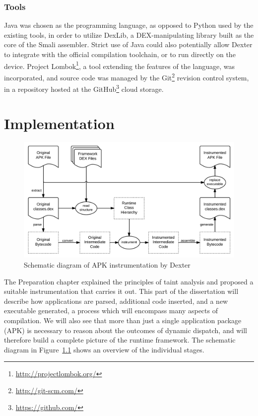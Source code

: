 \documentclass[12pt,twoside,notitlepage]{report}
\newcommand{\weblink}[1] {\footnote{\scriptsize\url{#1}}}
\begin{document}
\subsection{Tools}

Java was chosen as the programming language, as opposed to Python used by the existing tools, in order to utilize DexLib, a DEX-manipulating library built as the core of the Smali assembler. Strict use of Java could also potentially allow Dexter to integrate with the official compilation toolchain, or to run directly on the device. Project Lombok\weblink{http://projectlombok.org/}, a tool extending the features of the language, was incorporated, and source code was managed by the Git\weblink{http://git-scm.com/} revision control system, in a repository hosted at the GitHub\weblink{https://github.com/} cloud storage.

\cleardoublepage
\chapter{Implementation}

\begin{figure}
	\centerline{	
		\includegraphics[width=\textwidth]{figs/fig_implementation_overview.png}
	}
	\caption{Schematic diagram of APK instrumentation by Dexter}
	\label{fig:Implementation_Overview}
\end{figure}

The Preparation chapter explained the principles of taint analysis and proposed a suitable instrumentation that carries it out. This part of the dissertation will describe how applications are parsed, additional code inserted, and a new executable generated, a process which will encompass many aspects of compilation. We will also see that more than just a single application package (APK) is necessary to reason about the outcomes of dynamic dispatch, and will therefore build a complete picture of the runtime framework. The schematic diagram in Figure~\ref{fig:Implementation_Overview} shows an overview of the individual stages.
\end{document}
